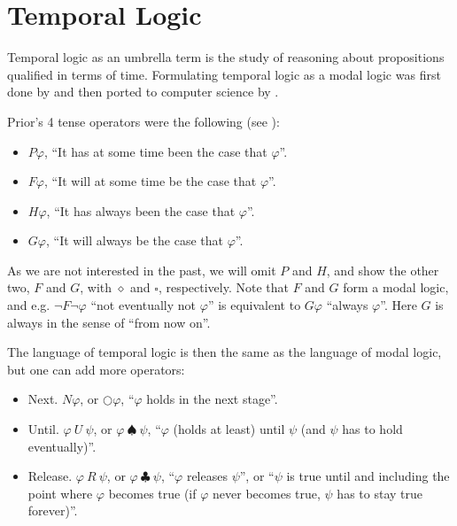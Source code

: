 \section{Temporal Logic}

Temporal logic as an umbrella term is the study of reasoning about propositions qualified in terms of time. Formulating temporal logic as a modal logic was first done by \cite{PRIOR1957,PRIOR1967,prior1968papers} and then ported to computer science by \cite{DBLP:conf/focs/Pnueli77}.

Prior's 4 tense operators were the following (see \cite{sep-logic-temporal}):
\begin{itemize}
    \item $P\varphi$, ``It has at some time been the case that $\varphi$''.
    \item $F\varphi$, ``It will at some time be the case that $\varphi$''.
    \item $H\varphi$, ``It has always been the case that $\varphi$''.
    \item $G\varphi$, ``It will always be the case that $\varphi$''.
\end{itemize}

As we are not interested in the past, we will omit $P$ and $H$, and show the other two, $F$ and $G$, with $\diamond$ and $\square$, respectively. Note that $F$ and $G$ form a modal logic, and e.g. $\neg{}F\neg\varphi$ ``not eventually not $\varphi$'' is equivalent to $G\varphi$ ``always $\varphi$''. Here $G$ is always in the sense of ``from now on''.

The language of temporal logic is then the same as the language of modal logic, but one can add more operators:
\begin{itemize}
    \item Next. $N\varphi$, or $\bigcirc\varphi$, ``$\varphi$ holds in the next stage''.
    \item Until. $\varphi~U~\psi$, or $\varphi~\spadesuit~\psi$, ``$\varphi$ (holds at least) until $\psi$ (and $\psi$ has to hold eventually)''.
    \item Release. $\varphi~R~\psi$, or $\varphi~\clubsuit~\psi$, ``$\varphi$ releases $\psi$'', or ``$\psi$ is true until and including the point where $\varphi$ becomes true (if $\varphi$ never becomes true, $\psi$ has to stay true forever)''.
\end{itemize}
